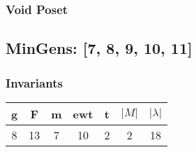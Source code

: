 \documentclass[a4paper]{article}
\begin{document}
\hfill\begin{minipage}{0.48\textwidth}
\subsubsection*{Void Poset}
\centering
{}
\end{minipage}
\newpage\subsection{MinGens: [7, 8, 9, 10, 11]}
\noindent\begin{minipage}{0.6\textwidth}
\subsubsection*{Invariants}
\centering
\begin{tabular}{|c|c|c|c|c|c|c|}
\toprule
g & F & m & ewt & t & \(|M|\) & \(|\lambda|\) \\
\midrule
8 & 13 & 7 & 10 & 2 & 2 & 18 \\
\bottomrule
\end{tabular}
\end{minipage}%
\end{document}

